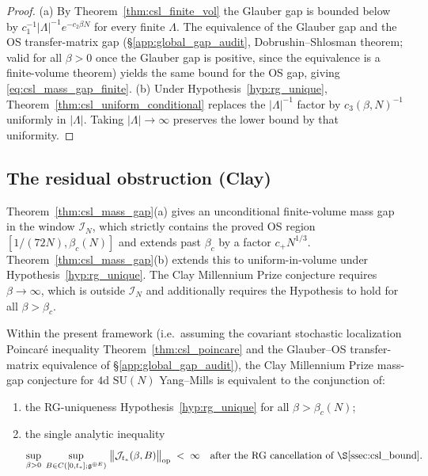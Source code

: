 \begin{proof}
(a) By Theorem~\ref{thm:csl_finite_vol} the Glauber gap is bounded
below by $c_{1}^{-1}|\Lambda|^{-1}e^{-c_{2}\beta N}$ for every finite
$\Lambda$. The equivalence of the Glauber gap and the OS
transfer-matrix gap (\S\ref{app:global_gap_audit},
Dobrushin--Shlosman theorem; valid for all $\beta>0$ once the Glauber
gap is positive, since the equivalence is a finite-volume theorem)
yields the same bound for the OS gap, giving \eqref{eq:csl_mass_gap_finite}.
(b) Under Hypothesis~\ref{hyp:rg_unique},
Theorem~\ref{thm:csl_uniform_conditional} replaces the
$|\Lambda|^{-1}$ factor by $c_{3}(\beta,N)^{-1}$ uniformly in
$|\Lambda|$. Taking $|\Lambda|\to\infty$ preserves the lower bound by
that uniformity.
\end{proof}

\subsection{The residual obstruction (Clay)}
\label{ssec:csl_residual}

Theorem~\ref{thm:csl_mass_gap}(a) gives an unconditional finite-volume
mass gap in the window $\mathcal{I}_{N}$, which strictly contains the
proved OS region $[1/(72N),\beta_{c}(N)]$ and extends past $\beta_{c}$
by a factor $c_{+}N^{1/3}$. Theorem~\ref{thm:csl_mass_gap}(b) extends
this to uniform-in-volume under Hypothesis~\ref{hyp:rg_unique}. The
Clay Millennium Prize conjecture requires $\beta\to\infty$, which is
outside $\mathcal{I}_{N}$ and additionally requires the
Hypothesis to hold for all $\beta>\beta_{c}$.

\begin{theorem}
\label{thm:csl_residual}
Within the present framework (i.e.\ assuming the covariant stochastic
localization Poincar\'{e} inequality Theorem~\ref{thm:csl_poincare}
and the Glauber--OS transfer-matrix equivalence of
\S\ref{app:global_gap_audit}), the Clay Millennium Prize mass-gap
conjecture for $4$d $\mathrm{SU}(N)$ Yang--Mills is equivalent to the
conjunction of:
\begin{enumerate}
\item the RG-uniqueness Hypothesis~\ref{hyp:rg_unique} for all
$\beta>\beta_{c}(N)$;
\item the single analytic inequality
\begin{equation}
\label{eq:residual}
  \sup_{\beta>0}\;\sup_{B\in C([0,t_{*}];\mathfrak{g}^{\oplus E})}
  \;\bigl\|\mathcal{J}_{t_{*}}(\beta,B)\bigr\|_{\mathrm{op}}
  \;<\;\infty
  \quad\text{after the RG cancellation of \S\ref{ssec:csl_bound}.}
\end{equation}
\end{enumerate}
\end{theorem}

